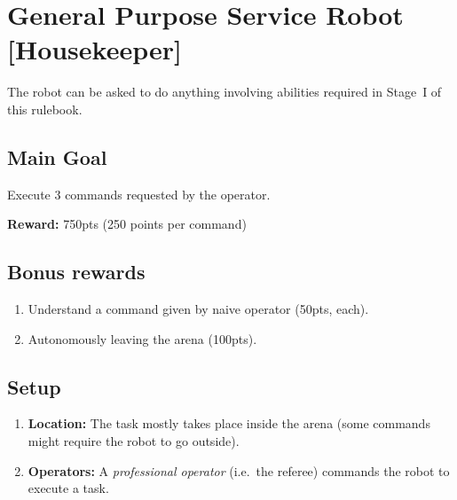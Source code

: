 \section{General Purpose Service Robot [Housekeeper]}
\label{test:gpsr}
The robot can be asked to do anything involving abilities required in Stage~I of this rulebook.


\subsection*{Main Goal}
Execute 3 commands requested by the operator.

\noindent\textbf{Reward:} 750pts (250 points per command)\\

\subsection*{Bonus rewards}
\begin{enumerate}[nosep]
	\item Understand a command given by naive operator (50pts, each).
	\item Autonomously leaving the arena (100pts).
\end{enumerate}

%
%
\subsection*{Setup}
\begin{enumerate}[nosep]
	\item \textbf{Location:} The task mostly takes place inside the arena (some commands might require the robot to go outside).

	\item \textbf{Operators:} A \emph{professional operator} (i.e.~the referee) commands the robot to execute a task.
\end{enumerate}


%
%
